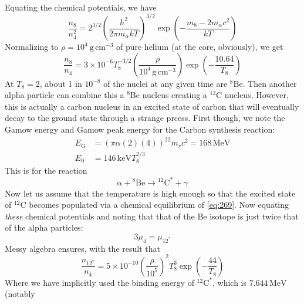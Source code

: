 \documentclass[10pt]{article}
\numberwithin{equation}{section}
\newcommand{\n}{\noindent}
\begin{document}
    \n Equating the chemical potentials, we have
    \begin{equation}
      \label{eq:266}
      \frac{n_8}{n_4^2}=2^{3/2}\left(\frac{h^2}{2\pi m_\alpha
          kT}\right)^{3/2}\exp\left(-\frac{m_8-2m_\alpha c^2}{kT}\right)
    \end{equation}
    Normalizing to $\rho=10^4\ \mathrm{g\,cm^{-3}}$ of pure helium (at
    the core, obviously), we get
    \begin{equation}
      \label{eq:267}
      \frac{n_8}{n_4}=3\times
      10^{-6}T_8^{-3/2}\left(\frac{\rho}{10^4\,\mathrm{g\,cm^{-3}}}\right)\exp\left(-\frac{10.64}{T_8}\right) 
    \end{equation}
    At $T_8=2$, about 1 in $10^{-8}$ of the nuclei at any given time
    are ${}^8\mathrm{Be}$. Then another alpha particle can combine
    this a ${}^8\mathrm{Be}$ nucleus creating a ${}^{12}\mathrm{C}$
    nucleus. However, this is actually a carbon nucleus in an excited
    state of carbon that will eventually decay to the ground state
    through a strange prcess. First though, we note the Gamow energy
    and Gamow peak energy for the Carbon synthesis reaction:
    \begin{align}
      \label{eq:268}
      E_\mathrm{G}&=\left(\pi\alpha(2)(4)\right)^22m_rc^2=168\,\mathrm{MeV}\\
      \label{eq:268a}
      E_0&=146\,\mathrm{keV}T_8^{2/3}
    \end{align}
    This is for the reaction
    \begin{equation}
      \label{eq:269}
      \mathrm{\alpha+{}^8Be\to{}^{12}C^*+\gamma}
    \end{equation}
    Now let us assume that the temperature is high enough so that the
    excited state of ${}^{12}\mathrm{C}$ becomes populated via a
    chemical equilibrium of \eqref{eq:269}. Now equating
    \textit{these} chemical potentials and noting that that of the Be
    isotope is just twice that of the alpha particles:
    \begin{equation}
      \label{eq:270}
      3\mu_4=\mu_{12^*}
    \end{equation}
    Messy algebra ensures, with the result that
    \begin{equation}
      \label{eq:271}
      \frac{n_{\mathrm{12^*}}}{n_4}=5\times
      10^{-10}\left(\frac{\rho}{10^5}\right)^2T_8^3\exp\left(-\frac{44}{T_8}\right)
    \end{equation}
    Where we have implicitly used the binding energy of
    ${}^{12}\mathrm{C}^*$, which is $7.644\,\mathrm{MeV}$ (notably
\end{document}
